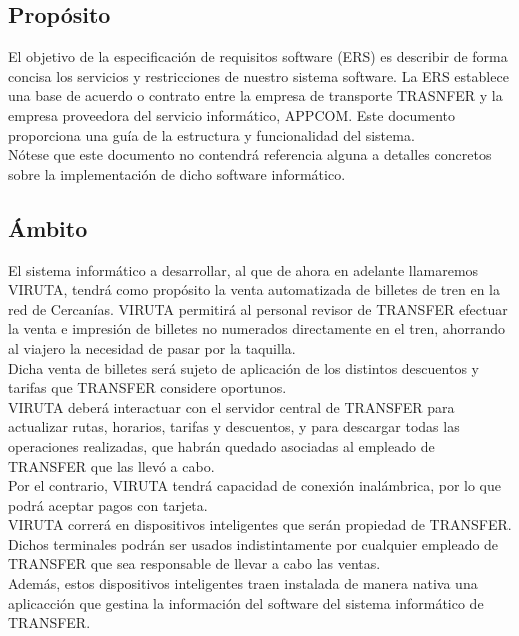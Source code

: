 \subsection{Propósito}

El objetivo de la especificación de requisitos software (ERS) es describir de forma concisa los servicios y restricciones de nuestro sistema software. La ERS establece una base de acuerdo o contrato entre la empresa de transporte TRASNFER y la empresa proveedora del servicio informático, APPCOM. Este documento proporciona una guía de la estructura y funcionalidad del sistema.\\

Nótese que este documento no contendrá referencia alguna a detalles concretos sobre la implementación de dicho software informático.

\subsection{Ámbito}

El sistema informático a desarrollar, al que de ahora en adelante llamaremos VIRUTA, tendrá como propósito la venta automatizada de billetes de tren en la red de Cercanías. VIRUTA permitirá al personal revisor de TRANSFER efectuar la venta e impresión de billetes no numerados directamente en el tren, ahorrando al viajero la necesidad de pasar por la taquilla.\\

Dicha venta de billetes será sujeto de aplicación de los distintos descuentos y tarifas que TRANSFER considere oportunos.\\

VIRUTA deberá interactuar con el servidor central de TRANSFER para actualizar rutas, horarios, tarifas y descuentos, y para descargar todas las operaciones realizadas, que habrán quedado asociadas al empleado de TRANSFER que las llevó a cabo.\\

Por el contrario, VIRUTA tendrá capacidad de conexión inalámbrica, por lo que podrá aceptar pagos con tarjeta.\\

VIRUTA correrá en dispositivos inteligentes que serán propiedad de TRANSFER. Dichos terminales podrán ser usados indistintamente por cualquier empleado de TRANSFER que sea responsable de llevar a cabo las ventas.\\

Además, estos dispositivos inteligentes traen instalada de manera nativa una aplicacción que gestina la información del software del sistema informático de TRANSFER.\\


